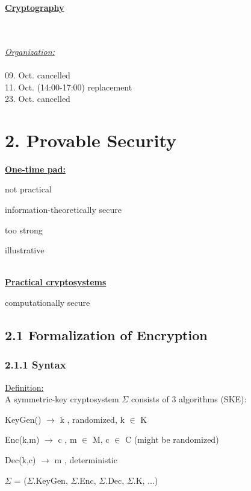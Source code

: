 \documentclass{report}
\begin{document}
 \begin{center}
 \huge{\textbf{\underline{Cryptography}}}
 \end{center}
 \hfill \\ \\
 
 \underline{\textit{Organization:}} \\ \\
 09. Oct.	 cancelled \\
 11. Oct. (14:00-17:00)	replacement \\
 23. Oct.	cancelled 
 
 {\let\clearpage\relax \chapter*{2. Provable Security}}
 \underline{\textbf{One-time pad:}} \\
 \begin{compactenum}[-]
 	\item not practical
 	\item information-theoretically secure
 	\begin{compactenum}[$\rightarrow$]
 		\item too strong
 	\end{compactenum}
 	\item illustrative
 \end{compactenum} 
 \hfill \\
 
 \underline{\textbf{Practical cryptosystems}} \\
 \begin{compactenum}[-]
 	\item computationally secure
 \end{compactenum}
 
 \section*{2.1 Formalization of Encryption}
 \subsection*{2.1.1 Syntax}
 \underline{Definition:} \\
 A symmetric-key cryptosystem $\Sigma$ consists of 3 algorithms (SKE):
 \begin{compactenum}[-]
 	\item KeyGen() $\rightarrow$ k	, randomized, k $\in$ K
 	\item Enc(k,m) $\rightarrow$ c	, m $\in$ M, c $\in$ C (might be randomized)
 	\item Dec(k,c) $\rightarrow$ m	, deterministic
 \end{compactenum}
 $\Sigma$ = ($\Sigma$.KeyGen, $\Sigma$.Enc, $\Sigma$.Dec, $\Sigma$.K, ...)
\end{document}
